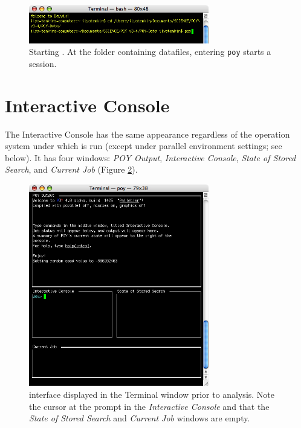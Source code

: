 \begin{figure}[htbp]
   \centering
   \includegraphics[width=0.7\textwidth]{figures/figprelim2.jpg}
   \caption{Starting \poy. At the folder containing datafiles, entering \texttt{poy} starts a \poy session.}
   \label{fig:figprelim2}
\end{figure}

\section{\poy Interactive Console}

The \poyv Interactive Console has the same appearance regardless of the operation system under which \poyv is run (except under parallel environment settings; see below). It has four windows: \emph{POY Output}, \emph{Interactive Console}, \emph{State of Stored Search}, and \emph{Current Job} (Figure \ref{fig:figinterface}).

\begin{figure}[htbp]
   \centering
   \includegraphics[width=0.7\textwidth]{figures/figinterface.jpg}
   \caption{\poy interface displayed in the Terminal window prior to analysis. Note the cursor at the \poy prompt in the \emph{Interactive Console} and that the \emph{State of Stored Search} and \emph{Current Job} windows are empty.}
   \label{fig:figinterface}
\end{figure}


